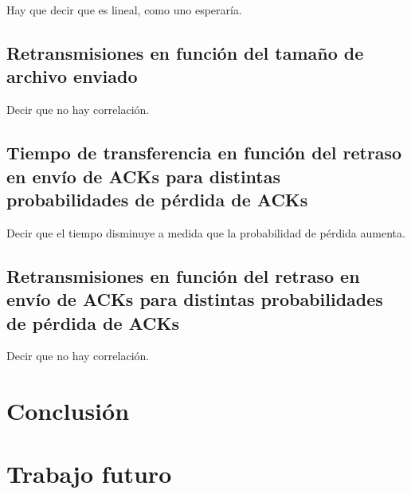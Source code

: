 \documentclass[a4paper, 10pt, twoside]{article}
\begin{document}
Hay que decir que es lineal, como uno esperaría.


\subsection{Retransmisiones en función del tamaño de archivo enviado}

Decir que no hay correlación.


\subsection{Tiempo de transferencia en función del retraso en envío de ACKs para distintas probabilidades de pérdida de ACKs}

Decir que el tiempo disminuye a medida que la probabilidad de pérdida aumenta.


\subsection{Retransmisiones en función del retraso en envío de ACKs para distintas probabilidades de pérdida de ACKs}

Decir que no hay correlación.




\section{Conclusión}






\section{Trabajo futuro}




\begin{thebibliography}{9}


\end{thebibliography}
\end{document}
